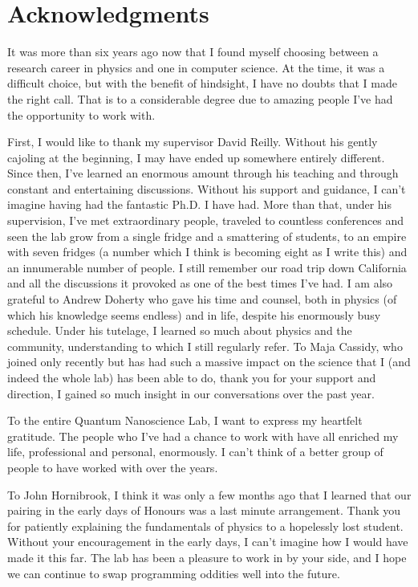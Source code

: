 \bgroup
\let\addcontentsline=\nocontentsline
\section*{Acknowledgments}
\egroup
{}
\addcontentsline{toc}{chapter}{Acknowledgements}

It was more than six years ago now that I found myself choosing between a research career in physics and
one in computer science. At the time, it was a difficult choice, but with the benefit of hindsight, I have
no doubts that I made the right call. That is to a considerable degree due to amazing people I've had the
opportunity to work with.

First, I would like to thank my supervisor David Reilly. Without his gently cajoling at the beginning, I may have ended
up somewhere entirely different. Since then, I've learned an enormous amount through his teaching and through
constant and entertaining discussions. Without his support and guidance, I can't imagine having had the
fantastic Ph.D. I have had. More than that, under his supervision, I've met extraordinary people, traveled
to countless conferences and seen the lab grow from a single fridge and a smattering of students, to an empire
with seven fridges (a number which I think is becoming eight as I write this) and an innumerable number
of people. I still remember our road trip down California and all the discussions it provoked as one of the best times I've had.
I am also grateful to Andrew Doherty who gave his time and counsel, both in physics (of which his
knowledge seems endless) and in life, despite his enormously busy schedule. Under his tutelage, I learned so much about
physics and the community, understanding to which I still regularly refer. To Maja Cassidy, who joined only recently
but has had such a massive impact on the science that I (and indeed the whole lab) has been able to do, thank you
for your support and direction, I gained so much insight in our conversations over the past year.

To the entire Quantum Nanoscience Lab, I want to express my heartfelt gratitude. The people who I've had a chance
to work with have all enriched my life, professional and personal, enormously. I can't think of a better group of
people to have worked with over the years.

To John Hornibrook, I think it was only a few months ago that I learned that our pairing in the early days of Honours
was a last minute arrangement. Thank you for patiently explaining the fundamentals of physics to a hopelessly lost
student. Without your encouragement in the early days, I can't imagine how I would have made it this far. The lab
has been a pleasure to work in by your side, and I hope we can continue to swap programming oddities well into the future.

